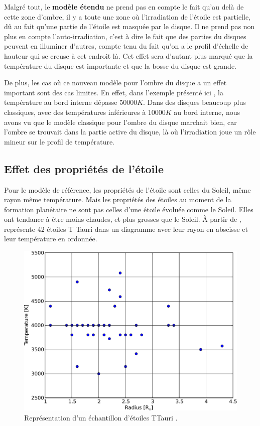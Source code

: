 Malgré tout, le \textbf{modèle étendu} ne prend pas en compte le fait qu'au delà de cette zone d'ombre, il y a toute une zone où l'irradiation de l'étoile est partielle, dû au fait qu'une partie de l'étoile est masquée par le disque. Il ne prend pas non plus en compte l'auto-irradiation, c'est à dire le fait que des parties du disques peuvent en illuminer d'autres, compte tenu du fait qu'on a le profil d'échelle de hauteur qui se creuse à cet endroit là. Cet effet sera d'autant plus marqué que la température du disque est importante et que la bosse du disque est grande. 

De plus, les cas où ce nouveau modèle pour l'ombre du disque a un effet important sont des cas limites. En effet, dans l'exemple présenté ici , la température au bord interne dépasse $50 000\unit{K}$. Dans des disques beaucoup plus classiques, avec des températures inférieures à $10 000\unit{K}$ au bord interne, nous avons vu que le modèle classique pour l'ombre du disque marchait bien, car l'ombre se trouvait dans la partie active du disque, là où l'irradiation joue un rôle mineur sur le profil de température.

\subsection{Effet des propriétés de l'étoile}
Pour le modèle de référence, les propriétés de l'étoile sont celles du Soleil, même rayon même température. Mais les propriétés des étoiles au moment de la formation planétaire ne sont pas celles d'une étoile évoluée comme le Soleil. Elles ont tendance à être moins chaudes, et plus grosses que le Soleil. À partir de \cite[Table 2]{hartigan1995disk},  représente 42 étoiles T Tauri dans un diagramme avec leur rayon en abscisse et leur température en ordonnée. 

\begin{figure}[htbp]
\centering
\includegraphics[width=0.5\linewidth]{figure/TTauri_sample.pdf}
\caption[Propriétés d'un échantillon d'étoiles T Tauri détectées.]{Représentation d'un échantillon d'étoiles TTauri
\citep{hartigan1995disk}. }\label{fig:TTauri_sample}
\end{figure}

